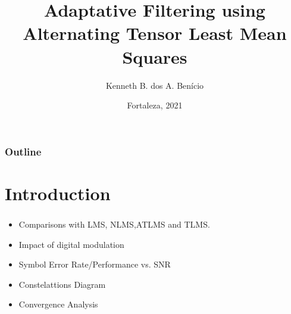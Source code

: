 \documentclass[10pt]{beamer}
\title[Short Title]{%
    Adaptative Filtering using Alternating Tensor Least Mean Squares 
    \vspace{0.5cm}
}
\author{Kenneth B. dos A. Benício}
\institute{
        \textit{Department of Teleinformatics Engineering}\\
        \textit{Federal University of Ceará}
        \vspace{0.5cm}
}
\date[Fortaleza, 2021]{%
    Fortaleza, 2021
}
\begin{document}

{
    \maketitle
}

 \begin{frame}
 \frametitle{Outline}
 \tableofcontents
 \end{frame}

\section{Introduction}
\begin{frame}
    \frametitle{\insertsection}
    \begin{itemize}
        \justifying
        \item Comparisons with LMS, NLMS,ATLMS and TLMS.
        \item Impact of digital modulation
        \item Symbol Error Rate/Performance vs. SNR
        \item Constelattions Diagram 
        \item Convergence Analysis 
    \end{itemize}
\end{frame}

\end{document}
